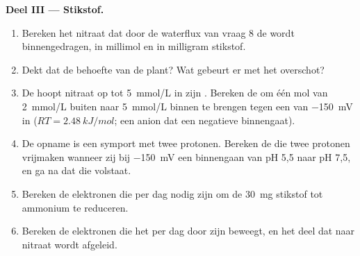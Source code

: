 \begin{problem}
\medskip
\noindent\textbf{Deel III --- Stikstof.}
\begin{enumerate}[resume]
  \item Bereken het nitraat dat door de waterflux van vraag 8 de 
        wordt binnengedragen, in millimol en in milligram stikstof.
  \item Dekt dat de behoefte van de plant? Wat gebeurt er met het
        overschot?
  \item De  hoopt nitraat op tot \qty{5}{mmol/L} in zijn .
        Bereken de  om één mol van \qty{2}{mmol/L} buiten
        naar \qty{5}{mmol/L} binnen te brengen tegen een
         van \qty{-150}{mV} in ($RT = \qty{2.48}{kJ/mol}$;
        een anion dat een negatieve  binnengaat).
  \item De opname is een symport met twee protonen. Bereken de  die twee protonen vrijmaken wanneer zij bij \qty{-150}{mV}
        een  binnengaan van pH 5,5 naar pH 7,5, en ga na dat die
        volstaat.
  \item Bereken de elektronen die per dag nodig zijn om de \qty{30}{mg}
        stikstof tot ammonium te reduceren.
  \item Bereken de elektronen die het  per dag door zijn 
        beweegt, en het deel dat naar nitraat wordt afgeleid.
\end{enumerate}


\end{problem}
